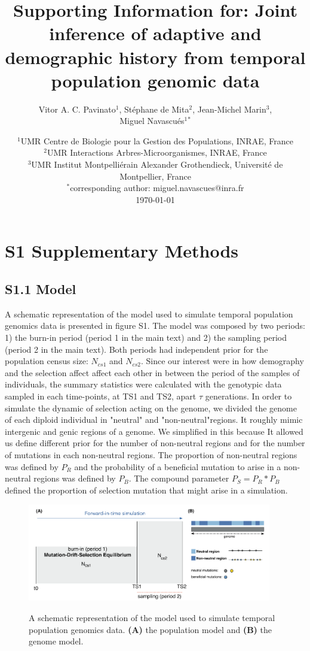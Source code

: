 \documentclass[12pt]{article}
\title{Supporting Information for: Joint inference of adaptive and demographic history from temporal population genomic data}
\author{Vitor A. C. Pavinato$^1$, Stéphane de Mita$^2$, Jean-Michel Marin$^3$, \\
			Miguel Navascués$^1$$^*$}
\date{{\myfont %
    $^1$UMR Centre de Biologie pour la Gestion des Populations, INRAE, France\\%
    $^2$UMR Interactions Arbres-Microorganismes, INRAE, France \\%
    $^3$UMR Institut Montpelliérain Alexander Grothendieck, Université de Montpellier, France\\%
    $^*$corresponding author: miguel.navascues@inra.fr\\[2ex]%
    }
    \today    
}
\begin{document}
\maketitle
\newpage
\section*{S1 Supplementary Methods}

\subsection*{S1.1 Model}

A schematic representation of the model used to simulate temporal population genomics data is presented in figure S1. The model was composed by two periods: 1) the burn-in period (period 1 in the main text) and 2) the sampling period (period 2 in the main text). Both periods had independent prior for the population census size: $N_{cs1}$ and $N_{cs2}$. Since our interest were in how demography and the selection affect affect each other in between the period of the samples of individuals, the summary statistics were calculated with the genotypic data sampled in each time-points, at TS1 and TS2, apart $\tau$ generations. In order to simulate the dynamic of selection acting on the genome, we divided the genome of each diploid individual in "neutral" and "non-neutral"regions. It roughly mimic intergenic and genic regions of a genome. We simplified in this because It allowed us define different prior for the number of non-neutral regions and for the number of mutations in each non-neutral regions. The proportion of non-neutral regions was defined by $P_{R}$ and the probability of a beneficial mutation to arise in a non-neutral regions was defined by $P_{B}$. The compound parameter $P_{S} = P_{R}*P_{B}$ defined the proportion of selection mutation that might arise in a simulation.

\begin{figure}[ht]
  \centering
  \includegraphics[width=0.95\textwidth]{Figures/model.pdf}
  \label{fig:figS1}
  \caption{A schematic representation of the model used to simulate temporal population genomics data. \textbf{(A)} the population model and \textbf{(B)} the genome model.}
\end{figure}
\end{document}
